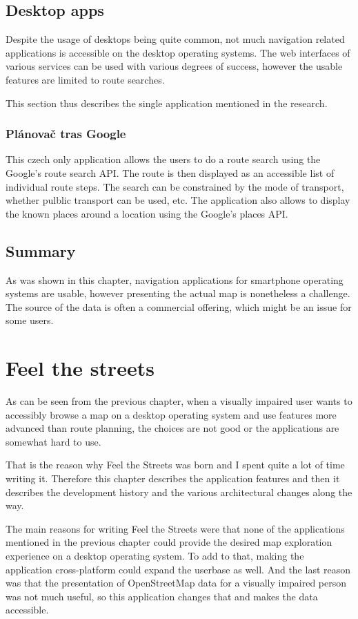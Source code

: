 \documentclass[nolof,digital]{fithesis3}
\begin{document}
\section{Desktop apps}
Despite the usage of desktops being quite common, not much navigation related applications is accessible on the desktop operating systems. The web interfaces of various services can be used with various degrees of success, however the usable features are limited to route searches.

This section thus describes the single application mentioned in the research.
\subsection{Plánovač tras Google}
This czech only application \parencite{ptg} allows the users to do a route search using the Google's route search API. The route is then displayed as an accessible list of individual route steps. The search can be constrained by the mode of transport, whether pulblic transport can be used, etc. The application also allows to display the known places around a location using the Google's places API.
\section{Summary}
As was shown in this chapter, navigation applications for smartphone operating systems are usable, however presenting the actual map is nonetheless a challenge. The source of the data is often a commercial offering, which might be an issue for some users.
\chapter{Feel the streets}
As can be seen from the previous chapter, when a visually impaired user wants to accessibly browse a map on a desktop operating system and use features more advanced than route planning, the choices are not good or the applications are somewhat hard to use.

That is the reason why Feel the Streets was born and I spent quite a lot of time writing it. Therefore this chapter describes the application features and then it describes the development history and the various architectural changes along the way.

The main reasons for writing Feel the Streets were that none of the applications mentioned in the previous chapter could provide the desired map exploration experience on a desktop operating system. To add to that, making the application cross-platform could expand the userbase as well. And the last reason was that the presentation of OpenStreetMap data for a visually impaired person was not much useful, so this application changes that and makes the data accessible.
\end{document}
